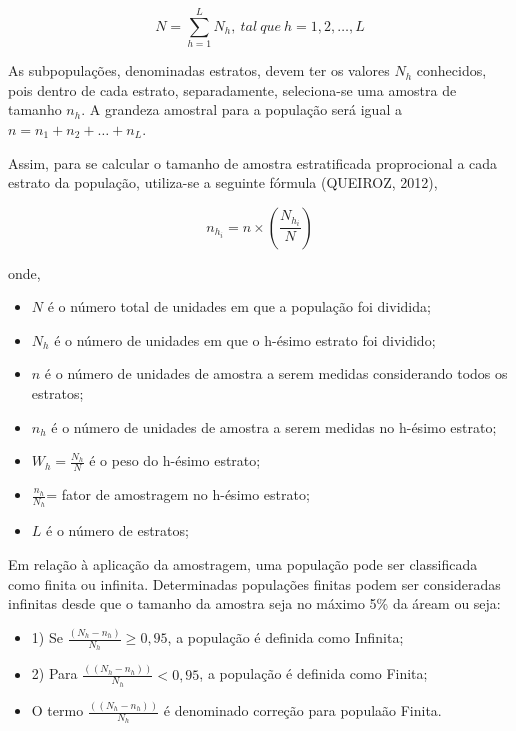 \begin{equation}\label{N}
    N=\sum_{h=1}^{L}N_{h}, \ tal \ que \ h=1,2,\ldots,L
\end{equation}


As subpopulações, denominadas estratos, devem ter os valores
$N_{h}$ conhecidos, pois dentro de cada estrato, separadamente,
seleciona-se uma amostra de tamanho $n_{h}$. A grandeza amostral
para a população será igual a $n=n_{1}+n_{2}+\ldots+n_{L}$.
\vskip0.3cm

Assim, para se calcular o tamanho de amostra estratificada
proprocional a cada estrato da população, utiliza-se a seguinte
fórmula (QUEIROZ, 2012),

\begin{equation}\label{amostestra}
n_{h_{i}} = n \times \left ( \frac{N_{h_{i}}}{N} \right )
\end{equation}

onde, 

\begin{itemize}
\item $N$ é o número total de unidades em que a população foi dividida;
\item $N_{h}$ é o número de unidades em que o h-ésimo estrato foi dividido;
\item $n$ é o número de unidades de amostra a serem medidas considerando todos os estratos;
\item $n_{h}$ é o número de unidades de amostra a serem medidas no h-ésimo estrato;
\item $W_{h}={\frac{N_{h}}{N}}$ é o peso do h-ésimo estrato;
\item $\frac{n_{h}}{N_{h}}$= fator de amostragem no h-ésimo estrato; 
\item $L$ é o número de estratos;
\end{itemize}

Em relação à aplicação da amostragem, uma população pode ser classificada como finita ou infinita. Determinadas populações finitas podem ser consideradas infinitas desde que o tamanho da amostra seja no máximo 5\% da áream ou seja:

\begin{itemize}
    \item 1) Se $\frac{(N_{h}-n_{h})}{N_{h}} \geqslant 0,95$, a população é definida como Infinita; 
    \item 2) Para $\frac{((N_{h}-n_{h}))}{N_{h}} < 0,95$, a população é definida como Finita;
    \item O termo $\frac{((N_{h}-n_{h}))}{N_{h}}$ é denominado correção para populaão Finita.
\end{itemize}













